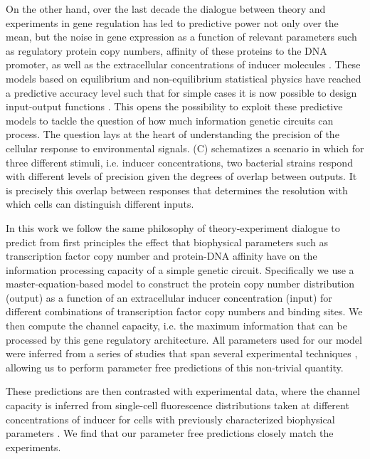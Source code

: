 On the other hand, over the last decade the dialogue between theory and
experiments in gene regulation has led to predictive power not only over the
mean, but the noise in gene expression as a function of relevant parameters such
as regulatory protein copy numbers, affinity of these proteins to the DNA
promoter, as well as the extracellular concentrations of inducer
molecules \cite{Garcia2011c, Jones2014a, Brewster2014, Razo-Mejia2018} . These models based on equilibrium and
non-equilibrium statistical physics have reached a predictive accuracy level
such that for simple cases it is now possible to design input-output functions
\cite{Brewster2012, Barnes2018}. This opens the possibility to exploit these
predictive models to tackle the question of how much information genetic
circuits can process. The question lays at the heart of understanding the
precision of the cellular response to environmental signals.
(C) schematizes a scenario in which for three different
stimuli, i.e. inducer concentrations, two bacterial strains respond with
different levels of precision given the degrees of overlap between outputs. It
is precisely this overlap between responses that determines the resolution with
which cells can distinguish different inputs.

In this work we follow the same philosophy of theory-experiment dialogue to
predict from first principles the effect that biophysical parameters such as
transcription factor copy number and protein-DNA affinity have on the
information processing capacity of a simple genetic circuit. Specifically we use
a master-equation-based model to construct the protein copy number distribution
(output) as a function of an extracellular inducer concentration (input) for
different combinations of transcription factor copy numbers and binding sites.
We then compute the channel capacity, i.e. the maximum information that can be
processed by this gene regulatory architecture. All parameters used for our
model were inferred from a series of studies that span several experimental
techniques \cite{Garcia2011c, Brewster2012, Jones2014a, Brewster2014,
Razo-Mejia2018}, allowing us to perform parameter free predictions of this
non-trivial quantity. 

These predictions are then contrasted with experimental data, where the channel
capacity is inferred from single-cell fluorescence distributions taken at
different concentrations of inducer for cells with previously characterized
biophysical parameters \cite{Garcia2011c, Razo-Mejia2018}. We find that our
parameter free predictions closely match the experiments. 

